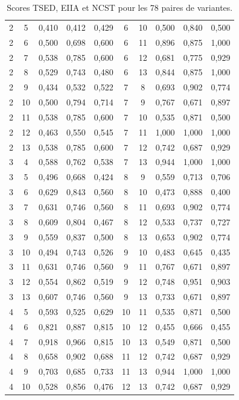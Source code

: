 \documentclass[12pt,a4paper,oneside]{report}
\begin{document}
\begin{table}[H]
\begin{tabular}{ccccc@{\hspace{1.2cm}}ccccc}
2 & 5 & 0,410 & 0,412 & 0,429 & 6 & 10 & 0,500 & 0,840 & 0,500 \\
2 & 6 & 0,500 & 0,698 & 0,600 & 6 & 11 & 0,896 & 0,875 & 1,000 \\
2 & 7 & 0,538 & 0,785 & 0,600 & 6 & 12 & 0,681 & 0,775 & 0,929 \\
2 & 8 & 0,529 & 0,743 & 0,480 & 6 & 13 & 0,844 & 0,875 & 1,000 \\
2 & 9 & 0,434 & 0,532 & 0,522 & 7 & 8 & 0,693 & 0,902 & 0,774 \\
2 & 10 & 0,500 & 0,794 & 0,714 & 7 & 9 & 0,767 & 0,671 & 0,897 \\
2 & 11 & 0,538 & 0,785 & 0,600 & 7 & 10 & 0,535 & 0,871 & 0,500 \\
2 & 12 & 0,463 & 0,550 & 0,545 & 7 & 11 & 1,000 & 1,000 & 1,000 \\
2 & 13 & 0,538 & 0,785 & 0,600 & 7 & 12 & 0,742 & 0,687 & 0,929 \\
3 & 4 & 0,588 & 0,762 & 0,538 & 7 & 13 & 0,944 & 1,000 & 1,000 \\
3 & 5 & 0,496 & 0,668 & 0,424 & 8 & 9 & 0,559 & 0,713 & 0,706 \\
3 & 6 & 0,629 & 0,843 & 0,560 & 8 & 10 & 0,473 & 0,888 & 0,400 \\
3 & 7 & 0,631 & 0,746 & 0,560 & 8 & 11 & 0,693 & 0,902 & 0,774 \\
3 & 8 & 0,609 & 0,804 & 0,467 & 8 & 12 & 0,533 & 0,737 & 0,727 \\
3 & 9 & 0,559 & 0,837 & 0,500 & 8 & 13 & 0,653 & 0,902 & 0,774 \\
3 & 10 & 0,494 & 0,743 & 0,526 & 9 & 10 & 0,483 & 0,645 & 0,435 \\
3 & 11 & 0,631 & 0,746 & 0,560 & 9 & 11 & 0,767 & 0,671 & 0,897 \\
3 & 12 & 0,554 & 0,862 & 0,519 & 9 & 12 & 0,748 & 0,951 & 0,903 \\
3 & 13 & 0,607 & 0,746 & 0,560 & 9 & 13 & 0,733 & 0,671 & 0,897 \\
4 & 5 & 0,593 & 0,525 & 0,629 & 10 & 11 & 0,535 & 0,871 & 0,500 \\
4 & 6 & 0,821 & 0,887 & 0,815 & 10 & 12 & 0,455 & 0,666 & 0,455 \\
4 & 7 & 0,918 & 0,966 & 0,815 & 10 & 13 & 0,549 & 0,871 & 0,500 \\
4 & 8 & 0,658 & 0,902 & 0,688 & 11 & 12 & 0,742 & 0,687 & 0,929 \\
4 & 9 & 0,703 & 0,685 & 0,733 & 11 & 13 & 0,944 & 1,000 & 1,000 \\
4 & 10 & 0,528 & 0,856 & 0,476 & 12 & 13 & 0,742 & 0,687 & 0,929 \\
\bottomrule
\end{tabular}
\caption{Scores TSED, EIIA et NCST pour les 78 paires de variantes.}
\label{tab:paires_completes}
\end{table}


\printbibliography[heading=bibintoc,title={Bibliographie}]
\end{document}
